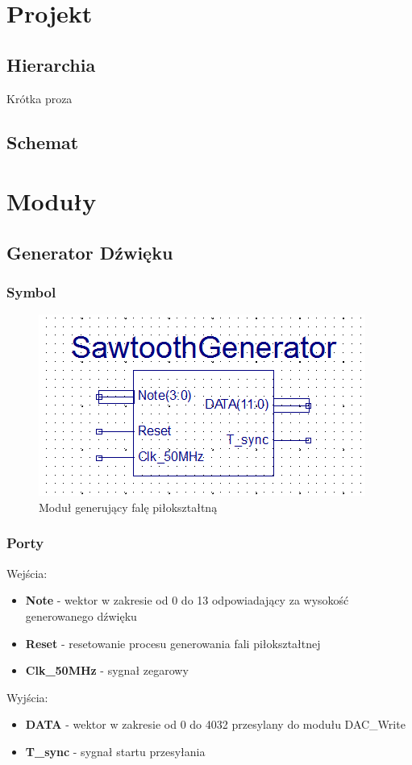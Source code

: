 \documentclass[a4paper]{report}
\begin{document}
\chapter{Projekt}
	\section{Hierarchia}
	Krótka proza
	\section{Schemat}
\chapter{Moduły}
	\section{Generator Dźwięku}
		\subsection{Symbol}
			\begin{figure}[h!]
				\centering
				\includegraphics{sawtoothgenerator2.png}
				\caption{Moduł generujący falę piłokształtną}
			\end{figure}
		\subsection{Porty}
		{\Large Wejścia:}
			\begin{itemize}	 
				\item \textbf{Note} - wektor w zakresie od 0 do 13 odpowiadający za wysokość generowanego dźwięku
				\item \textbf{Reset} - resetowanie procesu generowania fali piłokształtnej
				\item \textbf{Clk\_50MHz} - sygnał zegarowy
			\end{itemize}
		{\Large Wyjścia:}
			\begin{itemize} 
				\item \textbf{DATA} - wektor w zakresie od 0 do 4032 przesylany do modułu DAC\_Write
				\item \textbf{T\_sync} - sygnał startu przesyłania
			\end{itemize}
\end{document}
